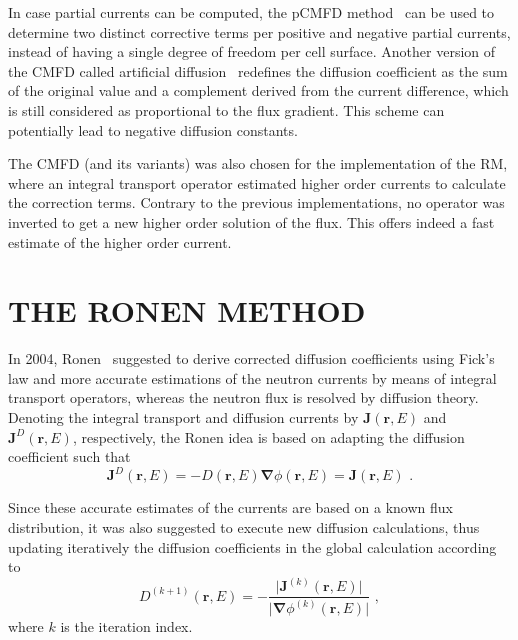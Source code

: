 \documentclass[letterpaper]{physor2020}
\newcommand{\rr}{\ensuremath{\bm{r}}}
\newcommand{\bnabla}{\ensuremath{\bm{\nabla}}}
\newcommand{\rE}{\ensuremath{(\rr,E)}}
\begin{document}
In case partial currents can be computed, the pCMFD method~\cite{Cho-2003} can be used to determine two distinct corrective terms per positive and negative partial currents, instead of having a single degree of freedom per cell surface. Another version of the CMFD called artificial diffusion~\cite{Zhu-2016,Jarrett-2016} redefines the diffusion coefficient as the sum of the original value and a complement derived from the current difference, which is still considered as proportional to the flux gradient. This scheme can potentially lead to negative diffusion constants.

The CMFD (and its variants) was also chosen for the implementation of the RM, where an integral transport operator estimated higher order currents to calculate the correction terms. Contrary to the previous implementations, no operator was inverted to get a new higher order solution of the flux. This offers indeed a fast estimate of the higher order current.


\section{THE RONEN METHOD} 
\label{sec:RM}

In 2004, Ronen~\cite{Ronen-2004} suggested to derive corrected diffusion coefficients using Fick's law and more accurate estimations of the neutron currents by means of integral transport operators, whereas the neutron flux is resolved by diffusion theory. Denoting the integral transport and diffusion currents by $\bm{J}\rE$ and $\bm{J}^D\rE$, respectively, the Ronen idea is based on adapting the diffusion coefficient such that
\begin{equation}\label{eq:Fick}
\bm{J}^D\rE = -D\rE\bnabla\phi\rE = \bm{J}\rE \,\, . 
\end{equation}

Since these accurate estimates of the currents are based on a known flux distribution, it was also suggested to execute new diffusion calculations, thus updating iteratively the diffusion coefficients in the global calculation according to 
\begin{equation}\label{eq:RM-it}
D^{(k+1)}\rE = - \frac{\lvert \bm{J}^{(k)}\rE\rvert}{\lvert\bnabla\phi^{(k)}\rE\rvert} \,\, ,
\end{equation}
where $k$ is the iteration index. %
\end{document}

